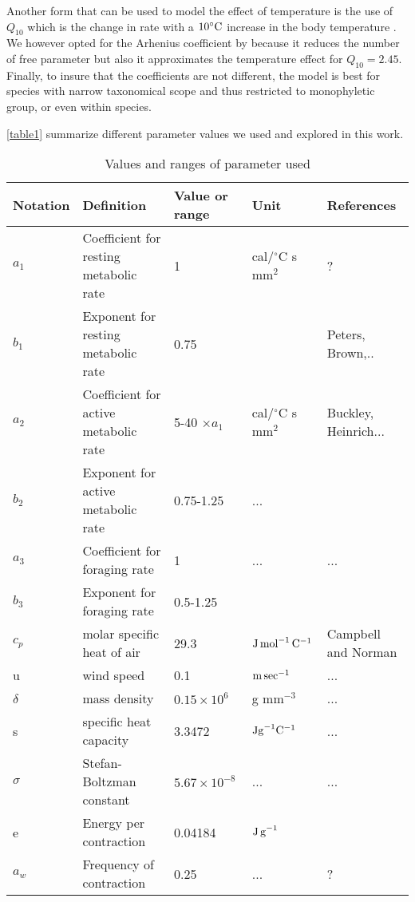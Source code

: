 Another form that can be used to model the effect of temperature is the use of $Q_{10}$ which is the change in rate with a $10^ {\circ} \rm{C}$ increase in the body temperature \citep{Precht1973}.
We however opted for the Arhenius coefficient by \citet{Brown2004} because it reduces the number of free parameter but also it approximates the temperature effect for $Q_10 = 2.45$.  
Finally, to  insure that the coefficients are not different, the model is best for species with narrow taxonomical scope and thus restricted to monophyletic group, or even within species. 

\cref{table1} summarize different parameter values we used and explored in this work.

\begin{sidewaystable}
\caption{Values and ranges of parameter used }
\begin{tabular}{l l l l l}
\hline
Notation& Definition & Value or range & Unit & References \\ 
\hline
$a_1$ & Coefficient for resting metabolic rate  & 1 &  cal/$^{\circ}$C s mm$^2$ &  ?\citet{Heinrich1975} \\
$b_1$ & Exponent for resting metabolic rate  & 0.75 &  &  Peters, Brown,.. \\
$a_2$ & Coefficient for active metabolic rate  & 5-40 $ \times a_1$ &  cal/$^{\circ}$C s mm$^2$ &  Buckley, Heinrich... \\
$b_2$ & Exponent for active metabolic rate  & 0.75-1.25 & ... &  \citet{Heinrich1975} \\
$a_3$ & Coefficient for foraging rate  & 1 & ...  &  ... \\
$b_3$ & Exponent  for foraging rate  & 0.5-1.25 &  &  \citet{Nervo2014} \\
$c_p$ & molar specific heat of air  & 29.3 &  $\rm{J \, mol}^ {-1} \, \rm{C}^ {-1}$ & Campbell and Norman \\
u &  wind speed & 0.1 & $\rm{m \, sec}^{-1}$ & ...\\
$\delta $ & mass density & $0.15 \times 10^6$  & g  mm$^{-3}$  & ... \\
s & specific heat capacity & 3.3472 & $\rm{J g}^{-1} \rm{C}^{-1}$ & ... \\
$\sigma$ & Stefan-Boltzman constant & $5.67 \times 10^{-8}$ & ... & ...\\
e & Energy per contraction & 0.04184 & $\rm{J \, g}^{-1}$ &\citet{Kammer1974} \\
$a_w$& Frequency of contraction & 0.25 & ...& ?\citet{Bartholomew1977b}\\

\end{tabular}
\end{sidewaystable}
